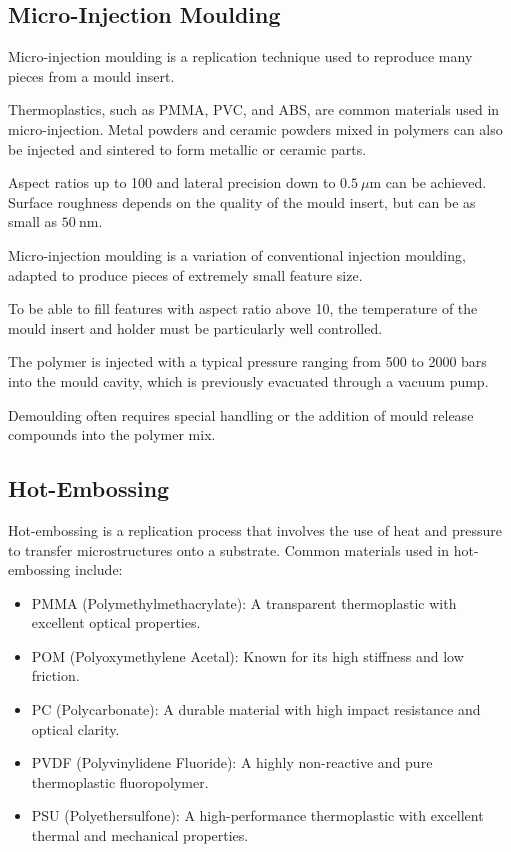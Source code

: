 \documentclass{report}
\begin{document}
\subsection{Micro-Injection Moulding}
Micro-injection moulding is a replication technique used to reproduce many pieces from a mould insert.

Thermoplastics, such as PMMA, PVC, and ABS, are common materials used in micro-injection. Metal powders and ceramic powders mixed in polymers can also be injected and sintered to form metallic or ceramic parts.

Aspect ratios up to 100 and lateral precision down to $0.5~\mu\mathrm{m}$ can be achieved. Surface roughness depends on the quality of the mould insert, but can be as small as $50~\mathrm{nm}$.

Micro-injection moulding is a variation of conventional injection moulding, adapted to produce pieces of extremely small feature size.

To be able to fill features with aspect ratio above 10, the temperature of the mould insert and holder must be particularly well controlled.

The polymer is injected with a typical pressure ranging from 500 to 2000 bars into the mould cavity, which is previously evacuated through a vacuum pump.

Demoulding often requires special handling or the addition of mould release compounds into the polymer mix.

\subsection{Hot-Embossing}
Hot-embossing is a replication process that involves the use of heat and pressure to transfer microstructures onto a substrate. Common materials used in hot-embossing include:
\begin{itemize}
    \item PMMA (Polymethylmethacrylate): A transparent thermoplastic with excellent optical properties.
    \item POM (Polyoxymethylene Acetal): Known for its high stiffness and low friction.
    \item PC (Polycarbonate): A durable material with high impact resistance and optical clarity.
    \item PVDF (Polyvinylidene Fluoride): A highly non-reactive and pure thermoplastic fluoropolymer.
    \item PSU (Polyethersulfone): A high-performance thermoplastic with excellent thermal and mechanical properties.
\end{itemize}
\end{document}

